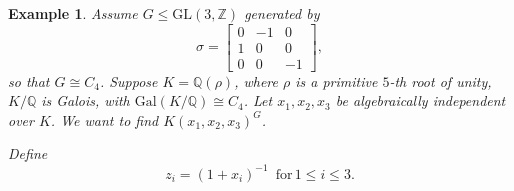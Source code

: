 \documentclass[12pt]{article}
\theoremstyle{plain}
\newtheorem{example}[theorem]{Example}
\newcommand{\Z}{\ensuremath{\mathbb{Z}}}
\newcommand{\Q}{\ensuremath{\mathbb{Q}}}
\begin{document}
\begin{example}
Assume $G\leq \mathrm{GL}(3,\Z)$ generated by $$
\sigma = \begin{bmatrix}
0&-1&0\\
1&0&0\\
0&0&-1
\end{bmatrix}
,$$
so that $G \cong C_4$. Suppose $K= \Q(\rho)$, where $\rho$ is a primitive $5$-th root of unity, $K/\Q$ is Galois, with $\mathrm{Gal}(K/\Q) \cong C_4$. Let $x_1, x_2, x_3$ be algebraically independent over $K$. We want to find $K(x_1,x_2,x_3)^G$. 
%

Define $$z_i = (1+x_i)^{-1}  \,\,\, \text{for} \, 1\leq i \leq 3. $$ 


\end{example}
\end{document}

